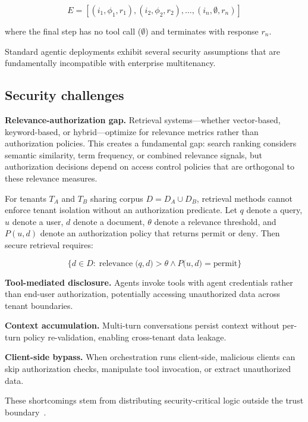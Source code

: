 \documentclass[sigconf]{acmart}
\begin{document}
\begin{equation}
E = [(i_1, \phi_1, r_1), (i_2, \phi_2, r_2), \dots, (i_n, \emptyset, r_n)]
\end{equation}

where the final step has no tool call ($\emptyset$) and terminates with response $r_n$.

Standard agentic deployments exhibit several security assumptions that are fundamentally incompatible with enterprise multitenancy.

\subsection{Security challenges}

\textbf{Relevance-authorization gap.} Retrieval systems---whether vector-based, keyword-based, or hybrid---optimize for relevance metrics rather than authorization policies. This creates a fundamental gap: search ranking considers semantic similarity, term frequency, or combined relevance signals, but authorization decisions depend on access control policies that are orthogonal to these relevance measures.

For tenants $T_A$ and $T_B$ sharing corpus $D = D_A \cup D_B$, retrieval methods cannot enforce tenant isolation without an authorization predicate. Let $q$ denote a query, $u$ denote a user, $d$ denote a document, $\theta$ denote a relevance threshold, and $P(u,d)$ denote an authorization policy that returns $\mathrm{permit}$ or $\mathrm{deny}$. Then secure retrieval requires:

\begin{equation}
\{ d \in D : \operatorname{relevance}\bigl(q,d\bigr) > \theta \wedge P\bigl(u,d\bigr) = \mathrm{permit} \}
\end{equation}

\textbf{Tool-mediated disclosure.} Agents invoke tools with agent credentials rather than end-user authorization, potentially accessing unauthorized data across tenant boundaries.

\textbf{Context accumulation.} Multi-turn conversations persist context without per-turn policy re-validation, enabling cross-tenant data leakage.

\textbf{Client-side bypass.} When orchestration runs client-side, malicious clients can skip authorization checks, manipulate tool invocation, or extract unauthorized data.

These shortcomings stem from distributing security-critical logic outside the trust boundary~\cite{sculley2015hiddentechnicaldebt,amershi2019se4ml,shapira2025agentsofchaos}.
\end{document}
